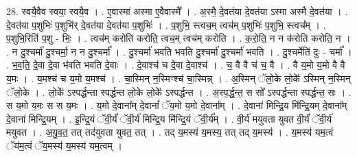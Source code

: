 \documentclass[17pt]{extarticle}
\begin{document}
28. स्वयै॒वैव स्वया॒ स्वयै॒व । . ए॒वास्मा॑ अस्मा ए॒वैवास्मै᳚ । . अ॒स्मै॒ दे॒वत॑या दे॒वत॑या ऽस्मा अस्मै दे॒वत॑या । . दे॒वत॑या प॒शुभिः॑ प॒शुभि॑र् दे॒वत॑या दे॒वत॑या प॒शुभिः॑ । . प॒शुभि॒ स्त्वच॒म् त्वच॑म् प॒शुभिः॑ प॒शुभि॒ स्त्वच᳚म् । . प॒शुभि॒रिति॑ प॒शु - भिः॒ । . त्वच॑म् करोति करोति॒ त्वच॒म् त्वच॑म् करोति । . क॒रो॒ति॒ न न क॑रोति करोति॒ न । . न दु॒श्चर्मा॑ दु॒श्चर्मा॒ न न दु॒श्चर्मा᳚ । . दु॒श्चर्मा॑ भवति भवति दु॒श्चर्मा॑ दु॒श्चर्मा॑ भवति । . दु॒श्चर्मेति॑ दुः - चर्मा᳚ । . भ॒व॒ति॒ दे॒वा दे॒वा भ॑वति भवति दे॒वाः । . दे॒वाश्च॑ च दे॒वा दे॒वाश्च॑ । . च॒ वै वै च॑ च॒ वै । . वै य॒मो य॒मो वै वै य॒मः । . य॒मश्च॑ च य॒मो य॒मश्च॑ । . चा॒स्मिन् न॒स्मिꣳश्च॑ चा॒स्मिन्न् । . अ॒स्मिन् ॅलो॒के लो॒के᳚ ऽस्मिन् न॒स्मिन् ॅलो॒के । . लो॒के᳚ ऽस्पर्द्धन्ता स्पर्द्धन्त लो॒के लो॒के᳚ ऽस्पर्द्धन्त । . अ॒स्प॒र्द्ध॒न्त॒ स सो᳚ ऽस्पर्द्धन्ता स्पर्द्धन्त॒ सः । . स य॒मो य॒मः स स य॒मः । . य॒मो दे॒वाना᳚म् दे॒वानां᳚ ॅय॒मो य॒मो दे॒वाना᳚म् । . दे॒वाना॑ मिन्द्रि॒य मि॑न्द्रि॒यम् दे॒वाना᳚म् दे॒वाना॑ मिन्द्रि॒यम् । . इ॒न्द्रि॒यं ॅवी॒र्यं॑ ॅवी॒र्य॑ मिन्द्रि॒य मि॑न्द्रि॒यं ॅवी॒र्य᳚म् । . वी॒र्य॑ मयुवता युवत वी॒र्यं॑ ॅवी॒र्य॑ मयुवत । . अ॒यु॒व॒त॒ तत् तद॑युवता युवत॒ तत् । . तद् य॒मस्य॑ य॒मस्य॒ तत् तद् य॒मस्य॑ । . य॒मस्य॑ यम॒त्वं ॅय॑म॒त्वं ॅय॒मस्य॑ य॒मस्य॑ यम॒त्वम् । \newline
\end{document}

